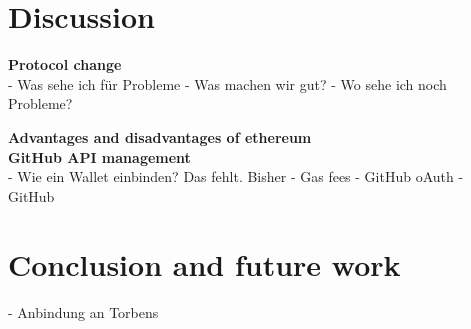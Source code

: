 \documentclass[sigconf]{acmart}
\begin{document}
\section{Discussion}
\textbf{Protocol change}\\
- Was sehe ich für Probleme
- Was machen wir gut?
- Wo sehe ich noch Probleme?

\textbf{Advantages and disadvantages of ethereum}\\


\textbf{GitHub API management}\\
- Wie ein Wallet einbinden? Das fehlt. Bisher 
- Gas fees
- GitHub oAuth
- GitHub

\section{Conclusion and future work}
- Anbindung an Torbens 







\appendix
\end{document}
